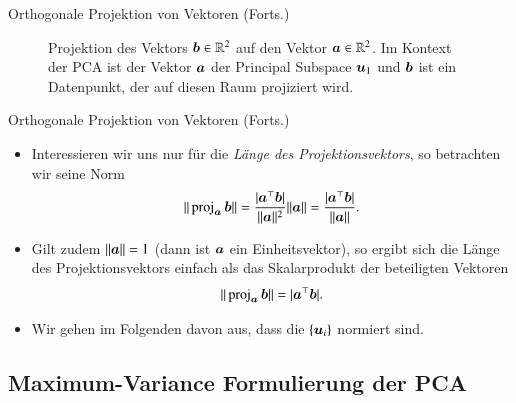 \begin{frame}{Orthogonale Projektion von Vektoren (Forts.)}{}
	\begin{figure}
		
		\caption{%
			Projektion des Vektors $\bm{b} \in \mathbb{R}^2$ auf den Vektor $\bm{a} \in \mathbb{R}^2$.
			Im Kontext der PCA ist der Vektor $\bm{a}$ der Principal Subspace $\bm{u}_1$ und $\bm{b}$ ist ein Datenpunkt,
			der auf diesen Raum projiziert wird.
		}
	\end{figure}
\end{frame}


\begin{frame}{Orthogonale Projektion von Vektoren (Forts.)}{}
	\begin{itemize}
		\item Interessieren wir uns nur für die \textit{Länge des Projektionsvektors}, so betrachten wir seine Norm
		\begin{equation}
			\Vert \operatorname{\text{proj}}_{\bm{a}} \bm{b} \Vert
				= \frac{\vert \bm{a}^\top \bm{b} \vert}{\Vert \bm{a} \Vert^2} \Vert \bm{a} \Vert
				= \frac{\vert \bm{a}^\top \bm{b} \vert}{\Vert \bm{a} \Vert}.
		\end{equation}
		\item Gilt zudem $\Vert \bm{a} \Vert = 1$ (dann ist $\bm{a}$ ein Einheitsvektor),
			so ergibt sich die Länge des Projektionsvektors einfach als das Skalarprodukt der beteiligten Vektoren
		\begin{equation}
			\Vert \operatorname{\text{proj}}_{\bm{a}} \bm{b} \Vert = \vert \bm{a}^\top \bm{b} \vert.
		\end{equation}
		\item Wir gehen im Folgenden davon aus, dass die  $\{ \bm{u}_i \}$ normiert sind.
	\end{itemize}
\end{frame}


\subsection{Maximum-Variance Formulierung der PCA}

